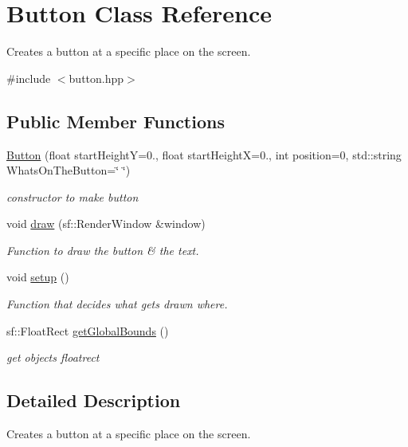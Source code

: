 \hypertarget{class_button}{}\section{Button Class Reference}
\label{class_button}


Creates a button at a specific place on the screen.  




{\ttfamily \#include $<$button.\+hpp$>$}

\subsection*{Public Member Functions}
\begin{DoxyCompactItemize}
\item 
\hyperlink{class_button_a1085aea4e01df12c1400d2f2f666dda2}{Button} (float start\+HeightY=0., float start\+HeightX=0., int position=0, std\+::string Whats\+On\+The\+Button=\char`\"{} \char`\"{})
\begin{DoxyCompactList}\small\item\em constructor to make button \end{DoxyCompactList}\item 
void \hyperlink{class_button_adf65892636ea303a84e1391106ea7cb0}{draw} (sf\+::\+Render\+Window \&window)
\begin{DoxyCompactList}\small\item\em Function to draw the button \& the text. \end{DoxyCompactList}\item 
void \hyperlink{class_button_aaf14334dd0ac6a9c286aac71a765caa2}{setup} ()
\begin{DoxyCompactList}\small\item\em Function that decides what gets drawn where. \end{DoxyCompactList}\item 
sf\+::\+Float\+Rect \hyperlink{class_button_af662f717b2230477da7d4760293473d4}{get\+Global\+Bounds} ()
\begin{DoxyCompactList}\small\item\em get objects floatrect \end{DoxyCompactList}\end{DoxyCompactItemize}


\subsection{Detailed Description}
Creates a button at a specific place on the screen. 

